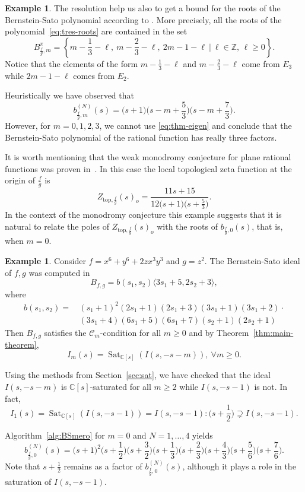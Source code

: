 \documentclass[a4paper,12pt]{amsart}
\theoremstyle{plain}
\theoremstyle{definition}
\newtheorem{ex}[theorem]{Example}
\theoremstyle{remark}
\def\CC{\mathbb{C}}
\def\ZZ{\mathbb{Z}}
\DeclareMathOperator{\Sat}{Sat}
\begin{document}
\begin{ex}
The resolution help us also to get a bound for the roots of the Bernstein-Sato polynomial
according to \cite[Theorem 4.1]{Tak23}. More precisely, all the roots of the polynomial~\eqref{eq:tres-roots}
are contained in the set
\[
B_{\frac{f}{g},m}^{\pi} = \left\{ m - \frac{1}{3} - \ell, \ m-\frac{2}{3}-\ell, \ 2m-1-\ell \ \Big| \ \ell \in \ZZ, \, \ell \geq 0 \right \}.
\]
Notice that the elements of the form $m-\frac{1}{3}-\ell$ and $m-\frac{2}{3}-\ell$ come from $E_3$ while $2m-1-\ell$ comes from $E_2$.

Heuristically we have observed that
\begin{equation*}
b_{\frac{f}{g},m}^{(N)}(s) = \Big(s+1\Big) \Big(s-m+\frac{5}{3}\Big) \Big(s-m+\frac{7}{3}\Big).
\end{equation*}
However, for $m =0,1,2,3$, we cannot use \eqref{eq:thm-eigen} and conclude that the Bernstein-Sato polynomial
of the rational function has really three factors.

It is worth mentioning that the weak monodromy conjecture for plane rational functions was proven in~\cite{GL14}.
In this case the local topological zeta function at the origin of $\frac{f}{g}$ is
\[
Z_{\textrm{top},\frac{f}{g}}(s)_o = \frac{11s + 15}{12 \big(s+1\big)\big(s+\frac{5}{3}\big)}.
\]
In the context of the monodromy conjecture this example suggests that it is natural to relate the poles of
$Z_{\textrm{top},\frac{f}{g}}(s)_o$ with the roots of $b_{\frac{f}{g},0}(s)$, that is, when $m=0$.
\end{ex}

\begin{ex}
Consider $f = x^6 + y^6 + 2zx^3y^3$ and $g = z^2$. The Bernstein-Sato ideal of $f,g$ was computed in~\cite{BO10}
\[
B_{f,g} = b(s_1,s_2) \langle 3s_1+5, 2s_2+3 \rangle,
\]
where
\[
\begin{aligned}
b(s_1,s_2) = \, & (s_1+1)^2 (2s_1+1) (2s_1+3) (3s_1+1) (3s_1+2) \cdot \\
& (3s_1+4) (6s_1+5) (6s_1+7) (s_2+1) (2s_2+1)
\end{aligned}
\]
Then $B_{f,g}$ satisfies the $\mathcal{C}_m$-condition for all $m \geq 0$
and by Theorem~\ref{thm:main-theorem},
\[
I_m(s) = \Sat_{\CC[s]}(I(s,-s-m)), \ \forall m \geq 0.
\]

Using the methods from Section~\ref{sec:sat}, we have checked that
the ideal $I(s,-s-m)$ is $\CC[s]$-saturated for all $m \geq 2$ while $I(s,-s-1)$ is not.
In fact,
\[
I_1(s) = \Sat_{\CC[s]}(I(s,-s-1)) = I(s,-s-1): \Big(s+\frac{1}{2}\Big) \supsetneq I(s,-s-1).
\]

Algorithm~\ref{alg:BSmero} for $m = 0$ and $N = 1,\ldots,4$ yields
\[
b_{\frac{f}{g},0}^{(N)}(s) = 
\Big(s+1\Big)^2
\Big(s+\frac{1}{2}\Big)
\Big(s+\frac{3}{2}\Big)
\Big(s+\frac{1}{3}\Big)
\Big(s+\frac{2}{3}\Big)
\Big(s+\frac{4}{3}\Big)
\Big(s+\frac{5}{6}\Big)
\Big(s+\frac{7}{6}\Big).
\]
Note that $s+\frac{1}{2}$ remains as a factor of $b_{\frac{f}{g},0}^{(N)}(s)$, although it plays a role in the saturation of $I(s,-s-1)$.
\end{ex}

%


\end{document}
